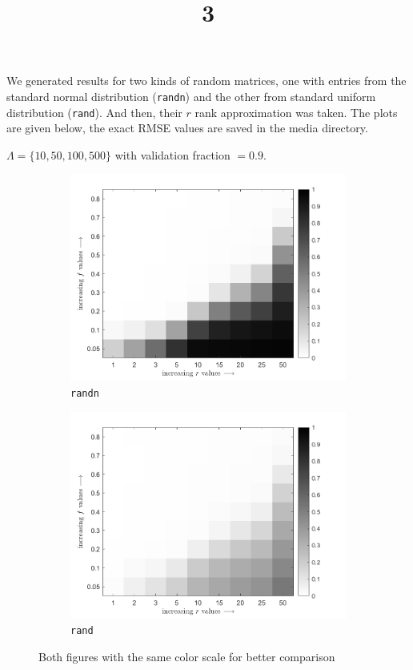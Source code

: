 \documentclass[a4paper]{article}
\title{3}
\date{}
\begin{document}
\maketitle
We generated results for two kinds of random matrices, one with entries from the standard normal distribution (\texttt{randn}) and the other from standard uniform distribution (\texttt{rand}). And then, their $r$ rank approximation was taken. The plots are given below, the exact RMSE values are saved in the media directory.

$\Lambda = \{10, 50, 100, 500\}$ with validation fraction $= 0.9$.
\begin{figure}[H]
	\centering
	\begin{subfigure}{0.45\linewidth}
		\centering
		\includegraphics[width=\linewidth]{../media/Q2 randn RMSEs.png}
		\caption{\texttt{randn}}
	\end{subfigure}
	\begin{subfigure}{0.45\linewidth}
		\centering
		\includegraphics[width=\linewidth]{../media/Q2 rand RMSEs.png}
		\caption{\texttt{rand}}
	\end{subfigure}
	\caption{Both figures with the same color scale for better comparison}
\end{figure}
\end{document}
